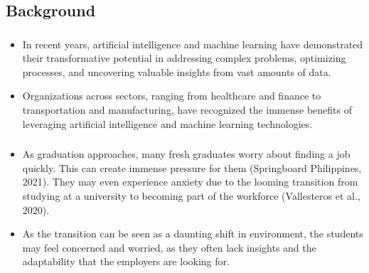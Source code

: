 \subsection{Background}
\begin{frame}
\frametitle{\subsecname}
	\begin{itemize}
		\item In recent years, artificial intelligence and machine learning have demonstrated their transformative potential in addressing complex problems, optimizing processes, and uncovering valuable insights from vast amounts of data.
		\item Organizations across sectors, ranging from healthcare and finance to transportation and manufacturing, have recognized the immense benefits of leveraging artificial intelligence and machine learning technologies.
	\end{itemize}
\end{frame}

\begin{frame}
\frametitle{\subsecname}
	\begin{itemize}
		\item As graduation approaches, many fresh graduates worry about finding a job quickly. This can create immense pressure for them (Springboard Philippines, 2021). They may even experience anxiety due to the looming transition from studying at a university to becoming part of the workforce (Vallesteros et al., 2020).
		\item As the transition can be seen as a daunting shift in environment, the students may feel concerned and worried, as they often lack insights and the adaptability that the employers are looking for.
	\end{itemize}
\end{frame}
